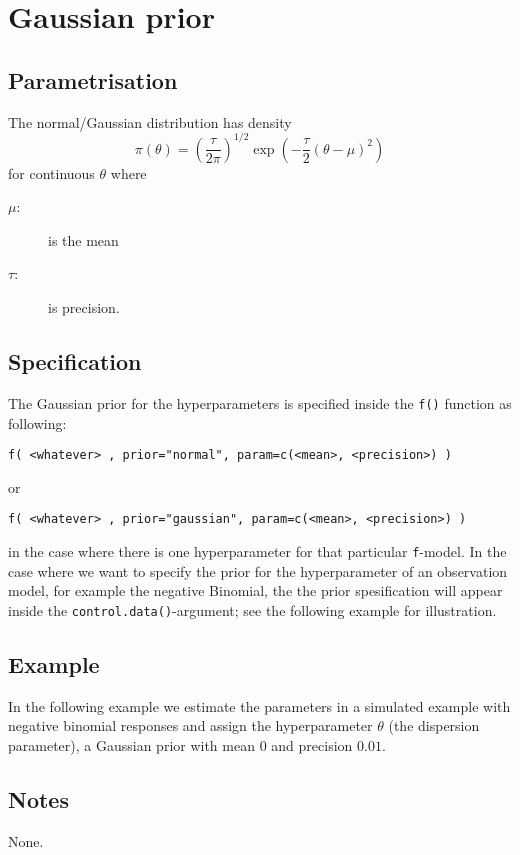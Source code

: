 \documentclass[a4paper,11pt]{article}
\begin{document}
\section*{Gaussian prior}

\subsection*{Parametrisation}
The normal/Gaussian distribution has density
\begin{equation}
    \pi(\theta)=\left(\frac{\tau}{2\pi}\right)^{1/2}
    \exp\left(-\frac{\tau}{2}(\theta-\mu)^2\right)
\end{equation}
for continuous $\theta$ where
\begin{description}
\item[$\mu$:] is the mean
\item[$\tau$:] is precision.
\end{description}

\subsection*{Specification}
The Gaussian prior for the hyperparameters is specified inside the
\texttt{f()} function as following:
\begin{center}
    \texttt{f( <whatever> , prior="normal", param=c(<mean>, <precision>) )}
\end{center}
or
\begin{center}
    \texttt{f( <whatever> , prior="gaussian", param=c(<mean>, <precision>) )}
\end{center}
in the case where there is one hyperparameter for that particular
\texttt{f}-model. In the case where we want to specify the prior for
the hyperparameter of an observation model, for example the negative
Binomial, the the prior spesification will appear inside the
\texttt{control.data()}-argument; see the following example for
illustration.

\subsection*{Example}
In the following example we estimate the parameters in a simulated
example with negative binomial responses and assign the hyperparameter
$\theta$ (the dispersion parameter), a Gaussian prior with mean $0$
and precision $0.01$.%


\subsection*{Notes}

None.
\end{document}

